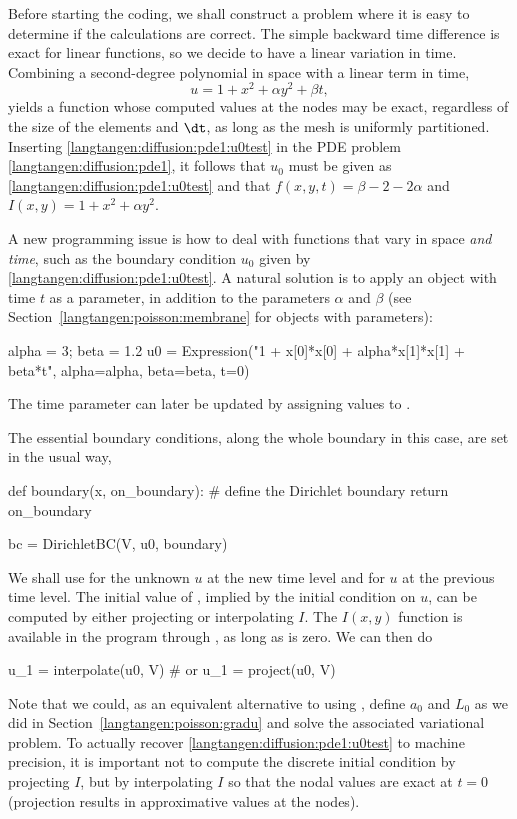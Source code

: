 Before starting the coding, we shall construct a problem where it is
easy to determine if the calculations are correct. The simple backward
time difference is exact for linear functions, so we decide to have
a linear variation in time. Combining a second-degree polynomial in space
with a linear term in time,
\begin{equation}
  u = 1 + x^2 + \alpha y^2 + \beta t,
\label{langtangen:diffusion:pde1:u0test}
\end{equation}
yields a function whose computed values at the nodes may be exact,
regardless of the size of the elements and ${\dt}$, as long as the mesh is
uniformly partitioned.  Inserting \eqref{langtangen:diffusion:pde1:u0test}
in the PDE problem \eqref{langtangen:diffusion:pde1}, it follows that
$u_0$ must be given as \eqref{langtangen:diffusion:pde1:u0test} and that
$f(x,y,t)=\beta - 2 - 2\alpha$ and $I(x,y)=1+x^2+\alpha y^2$.

A new programming issue is how to deal with functions that vary in
space \emph{and time}, such as the boundary condition $u_0$ given by
\eqref{langtangen:diffusion:pde1:u0test}.  A natural solution is
to apply an  object with time $t$ as a parameter,
in addition to the parameters $\alpha$ and $\beta$ (see
Section~\ref{langtangen:poisson:membrane} for 
objects with parameters):
\begin{python}
alpha = 3; beta = 1.2
u0 = Expression("1 + x[0]*x[0] + alpha*x[1]*x[1] + beta*t",
                alpha=alpha, beta=beta, t=0)
\end{python}
The time parameter can later be updated by assigning values to .

The essential boundary conditions, along the whole boundary in this case,
are set in the usual way,
\begin{python}
def boundary(x, on_boundary):  # define the Dirichlet boundary
    return on_boundary

bc = DirichletBC(V, u0, boundary)
\end{python}

We shall use  for the unknown $u$ at the new time level and
 for $u$ at the previous time level.
The initial value of , implied by the initial
condition on $u$, can be computed by either projecting or
interpolating $I$. The $I(x,y)$ function is available in the program
through , as long as  is zero.  We can then do
\begin{python}
u_1 = interpolate(u0, V)
# or
u_1 = project(u0, V)
\end{python}
Note that we could, as an equivalent alternative to using ,
define $a_0$ and $L_0$ as we did in Section~\ref{langtangen:poisson:gradu}
and solve the associated variational problem.  To actually recover
\eqref{langtangen:diffusion:pde1:u0test} to machine precision, it is
important not to compute the discrete initial condition by projecting
$I$, but by interpolating $I$ so that the nodal values are exact at $t=0$
(projection results in approximative values at the nodes).

